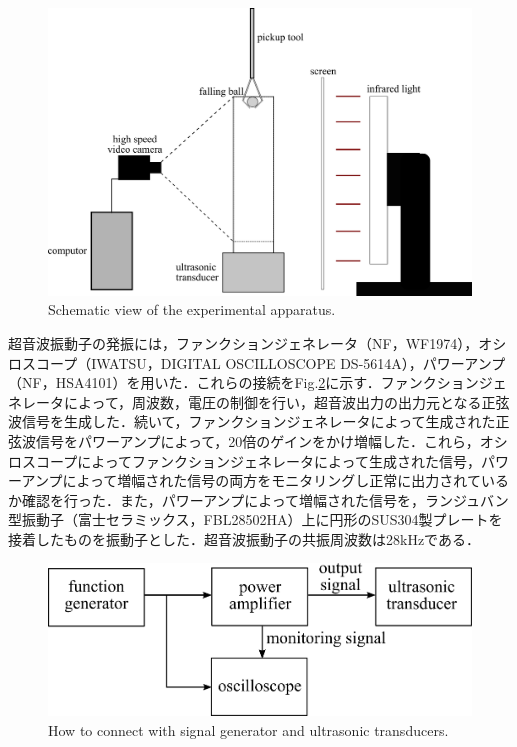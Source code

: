 \begin{figure}[h]
    \centering
    \includegraphics[clip,width=15.0cm]{2-Methods/device.png}
    \caption{Schematic view of the experimental apparatus.}
    \label{fig:device}
\end{figure}

\newpage

超音波振動子の発振には，ファンクションジェネレータ（NF，WF1974），オシロスコープ（IWATSU，DIGITAL OSCILLOSCOPE DS-5614A），パワーアンプ（NF，HSA4101）を用いた．これらの接続をFig.\ref{fig:connect-with-signal}に示す．ファンクションジェネレータによって，周波数，電圧の制御を行い，超音波出力の出力元となる正弦波信号を生成した．続いて，ファンクションジェネレータによって生成された正弦波信号をパワーアンプによって，20倍のゲインをかけ増幅した．これら，オシロスコープによってファンクションジェネレータによって生成された信号，パワーアンプによって増幅された信号の両方をモニタリングし正常に出力されているか確認を行った．また，パワーアンプによって増幅された信号を，ランジュバン型振動子（富士セラミックス，FBL28502HA）上に円形のSUS304製プレートを接着したものを振動子とした．超音波振動子の共振周波数は28kHzである．

\begin{figure}[h]
    \centering
    \includegraphics[clip,width=15.0cm]{2-Methods/connect-with-signal.png}
    \caption{How to connect with signal generator and ultrasonic transducers.}
    \label{fig:connect-with-signal}
\end{figure}

